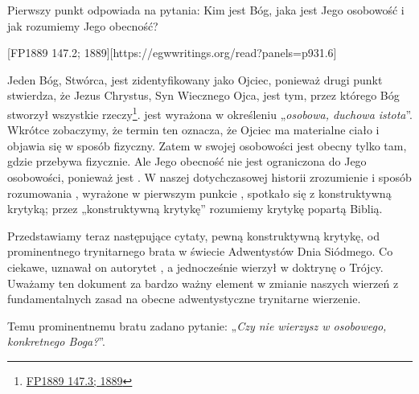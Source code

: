 
Pierwszy punkt  odpowiada na pytania: Kim jest Bóg, jaka jest Jego osobowość i jak rozumiemy Jego obecność?

[FP1889 147.2; 1889][https://egwwritings.org/read?panels=p931.6]

Jeden Bóg, Stwórca, jest zidentyfikowany jako Ojciec, ponieważ drugi punkt  stwierdza, że Jezus Chrystus, Syn Wiecznego Ojca, jest tym, przez którego Bóg stworzył wszystkie rzeczy\footnote{\href{https://egwwritings.org/?ref=en_FP1889.147.3&para=931.7}{FP1889 147.3; 1889}}.  jest wyrażona w określeniu „\textit{osobowa, duchowa istota}”. Wkrótce zobaczymy, że termin ten oznacza, że Ojciec ma materialne ciało i objawia się w sposób fizyczny. Zatem w swojej osobowości jest obecny tylko tam, gdzie przebywa fizycznie. Ale Jego obecność nie jest ograniczona do Jego osobowości, ponieważ jest . W naszej dotychczasowej historii zrozumienie i sposób rozumowania , wyrażone w pierwszym punkcie , spotkało się z konstruktywną krytyką; przez „konstruktywną krytykę” rozumiemy krytykę popartą Biblią.

Przedstawiamy teraz następujące cytaty, pewną konstruktywną krytykę, od prominentnego trynitarnego brata w świecie Adwentystów Dnia Siódmego. Co ciekawe, uznawał on autorytet , a jednocześnie wierzył w doktrynę o Trójcy. Uważamy ten dokument za bardzo ważny element w zmianie naszych wierzeń z fundamentalnych zasad na obecne adwentystyczne trynitarne wierzenie.

Temu prominentnemu bratu zadano pytanie: „\textit{Czy nie wierzysz w osobowego, konkretnego Boga?}”.


